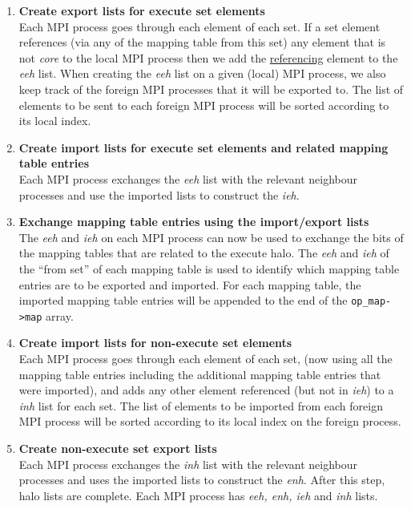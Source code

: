 \documentclass[11pt]{article}
\begin{document}
\begin{enumerate}
\item \textbf{Create export lists for execute set elements}\\
Each MPI process goes through each element of each set. If a set element
references (via any of the mapping table from this set) any element that is not
\textit{core} to the local MPI process then we add the \underline{referencing}
element to the \textit{eeh} list. When creating the \textit{eeh} list on a given
(local) MPI process, we also keep track of the foreign MPI processes that it
will be exported to. The list of elements to be sent to each foreign MPI process
will be sorted according to its local index.

\item \textbf{Create import lists for execute set elements and related mapping
table entries}\\
Each MPI process exchanges the \textit{eeh} list with the relevant neighbour
processes and use the imported lists to construct the \textit{ieh}.

\item \textbf{Exchange mapping table entries using the import/export lists}\\
The \textit{eeh} and \textit{ieh} on each MPI process can now be used to
exchange the bits of the mapping tables that are related to the execute halo.
The \textit{eeh} and \textit{ieh} of the ``from set'' of each mapping table is
used to identify which mapping table entries are to be exported and imported.
For each mapping table, the imported mapping table entries will be appended to
the end of the \texttt{op\_map->map} array.

\item \textbf{Create import lists for non-execute set elements }\\
Each MPI process goes through each element of each set, (now using all the
mapping table entries including the additional mapping table entries that were
imported), and adds any other element referenced (but not in \textit{ieh}) to a
\textit{inh} list for each set. The list of elements to be imported from each
foreign MPI process will be sorted according to its local index on the foreign
process.

\item \textbf{Create non-execute set export lists}\\
Each MPI process exchanges the \textit{inh} list with the relevant neighbour
processes and uses the imported lists to construct the \textit{enh}. After this
step, halo lists are complete. Each MPI process has \textit{eeh, enh, ieh} and
\textit{inh} lists.


\end{enumerate}
\end{document}
